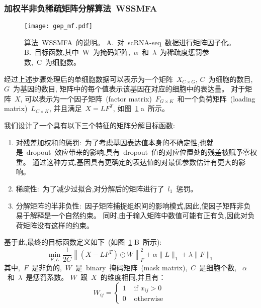 \subsubsection{加权半非负稀疏矩阵分解算法~WSSMFA}

\begin{figure}[!htbp]
    \centering
    \texttt{[image: gep\_mf.pdf]}
    \caption{
        算法~WSSMFA~的说明。
        A.~对~scRNA-seq~数据进行矩阵因子化。
        B.~目标函数,其中~W~为掩码矩阵,~$\alpha$~和~$\lambda$~为稀疏度惩罚参数,~C~为细胞数。
    }
    \label{fig:gep-mf}
\end{figure}

经过上述步骤处理后的单细胞数据可以表示为一个矩阵~$X_{C \times G}$, $C$~为细胞的数目, $G$~为基因的数目, 
矩阵中的每个值表示该基因在对应的细胞中的表达量。
对于矩阵~$X$, 可以表示为一个因子矩阵~(factor matrix)~$F_{G \times K}$~和一个负荷矩阵~(loading matrix)~$L_{C \times K}$,
并且满足~$X=LF^T$, 如图~\ref{fig:gep-mf} a~所示。 

我们设计了一个具有以下三个特征的矩阵分解目标函数:
\begin{enumerate}
    \item 对残差加权和的惩罚:~为了考虑基因表达值本身的不确定性,也就是~dropout~效应带来的影响,具有~dropout~值的对应位置处的残差被赋予零权重。
          通过这种方式,基因具有更确定的表达值的对最优参数估计有更大的影响。
    \item 稀疏性:~为了减少过拟合,对分解后的矩阵进行了~$l_1$~惩罚。
    \item 分解矩阵的半非负性:~因子矩阵捕捉组织间的影响模式,因此,使因子矩阵非负易于解释是一个自然约束。
          同时,由于输入矩阵中数值可能有正有负,因此对负荷矩阵没有这样的约束。
\end{enumerate}
基于此,最终的目标函数定义如下~(如图~\ref{fig:gep-mf} B~所示):
\begin{equation}
    \label{eq:obj}
    \min _{F, L} \frac{1}{2 C}\left\|\left(X-L F^{T}\right) \odot W\right\|_{F}^{2}+\alpha\|L\|_{1}+\lambda\|F\|_{1}
\end{equation}
其中,~$F$~是非负的,~$W$~是~binary~掩码矩阵~(mask matrix),~$C$~是细胞个数,
~$\alpha$~和~$\lambda$~是惩罚系数。
$W$~跟~$X$~的维度相同,并且有：
\begin{equation}
    W_{i j}=\left\{\begin{array}{ll}1 & \text { if } x_{i j}>0 \\ 0 & \text { otherwise }\end{array}\right.
\end{equation}

